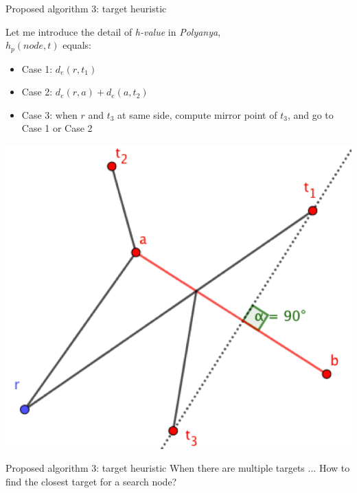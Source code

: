 \begin{frame}{Proposed algorithm 3: target heuristic}
\begin{minipage}{.5\textwidth}
\small{Let me introduce the detail of \textit{h-value} in \textit{Polyanya},\\
$h_p(node, t)$ equals}:
\begin{itemize}
    \item \small Case 1: $d_e(r, t_1)$
    \item \small Case 2: $d_e(r, a) + d_e(a, t_2)$
    \item \small Case 3: when $r$ and $t_3$ at same side, compute mirror point of $t_3$, and go to Case 1 or Case 2
    
\end{itemize}

\end{minipage}%
\begin{minipage}{.5\textwidth}
    \begin{adjustbox}{max totalsize={.9\textwidth}{.9\textheight}, right}
    \centering
    \includegraphics{pic/ef.png}
    \end{adjustbox}
\end{minipage}
\end{frame}

\begin{frame}{Proposed algorithm 3: target heuristic}
\small{
When there are multiple targets ...
}
\small{
    How to find the closest target for a search node?
}
\end{frame}

